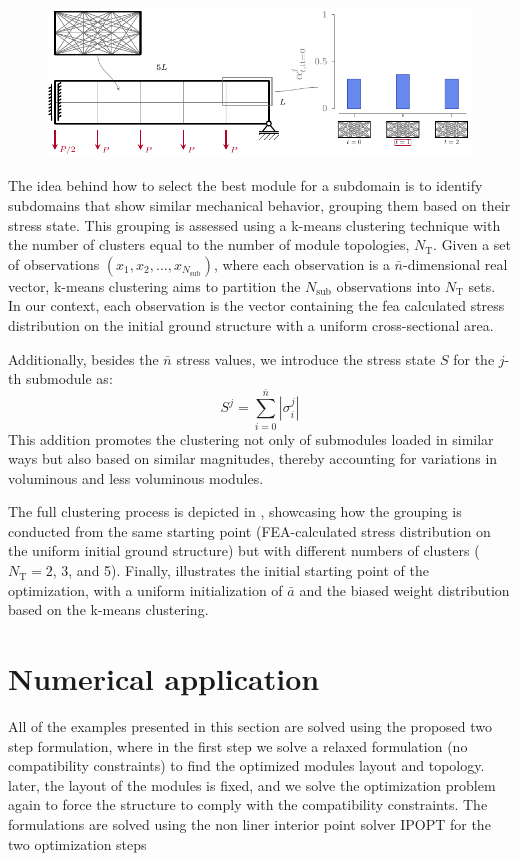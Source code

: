 \begin{figure}
    \centering
    \includegraphics{figures/06_DMO/00_x0/x0.pdf}
    \caption{}
    \label{fig:06_x0}
\end{figure}

The idea behind how to select the best module for a subdomain is to identify subdomains that show similar mechanical behavior, grouping them based on their stress state. This grouping is assessed using a k-means clustering technique with the number of clusters equal to the number of module topologies, $N_\text{T}$. Given a set of observations $(x_1, x_2, ..., x_{N_\text{sub}})$, where each observation is a $\bar{n}$-dimensional real vector, k-means clustering aims to partition the $N_\text{sub}$ observations into $N_\text{T}$ sets. In our context, each observation is the vector containing the \acrfull{fea} calculated stress distribution on the initial ground structure with a uniform cross-sectional area.

Additionally, besides the $\bar{n}$ stress values, we introduce the stress state $S$ for the $j$-th submodule as:
\begin{equation}
    S^j = \sum_{i=0}^{\bar{n}}|\sigma_i^j|
\end{equation}
This addition promotes the clustering not only of submodules loaded in similar ways but also based on similar magnitudes, thereby accounting for variations in voluminous and less voluminous modules.

The full clustering process is depicted in , showcasing how the grouping is conducted from the same starting point (FEA-calculated stress distribution on the uniform initial ground structure) but with different numbers of clusters ($N_\text{T}=2$, 3, and 5). Finally,  illustrates the initial starting point of the optimization, with a uniform initialization of $\bar{a}$ and the biased weight distribution based on the k-means clustering.

\section{Numerical application}\label{sec:06_num_app}
All of the examples presented in this section are solved using the proposed two step formulation, where in the first step we solve a relaxed formulation (no compatibility constraints) to find the optimized modules layout and topology. later, the layout of the modules is fixed, and we solve the optimization problem again to force the structure to comply with the compatibility constraints. The formulations are solved using the non liner interior point solver IPOPT for the two optimization steps 


